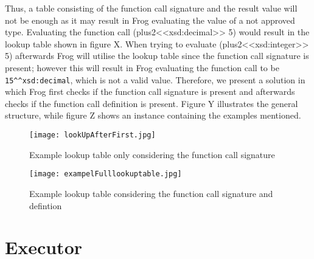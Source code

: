 \para
Thus, a table consisting of the function call signature and the result value will not be enough as it may result in Frog evaluating the value of a not approved type. Evaluating the function call (plus2<<xsd:decimal>> 5) would result in the lookup table shown in figure X. When trying to evaluate (plus2<<xsd:integer>> 5) afterwards Frog will utilise the lookup table since the function call signature is present; however this will result in Frog evaluating the function call to be \lstinline{15^^xsd:decimal}, which is not a valid value. Therefore, we present a solution in which Frog first checks if the function call signature is present and afterwards checks if the function call definition is present. Figure Y illustrates the general structure, while figure Z shows an instance containing the examples mentioned. 

\begin{figure}
    \centering
    \begin{minipage}{.5\textwidth}
      \centering
      \texttt{[image: lookUpAfterFirst.jpg]}
      \caption{Example lookup table only considering the function call signature}
      \label{fig:lookUpAfterFirst}
    \end{minipage}%
    \begin{minipage}{.5\textwidth}
      \centering
      \texttt{[image: exampelFulllookuptable.jpg]}
      \caption{Example lookup table considering the function call signature and defintion}
      \label{fig:exampelFulllookuptable}
    \end{minipage}
\end{figure}

\section{Executor}

